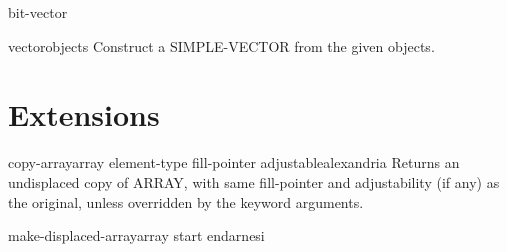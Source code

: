 \begin{class}{bit-vector}{}{}{}
  
\end{class}

\begin{class}{vector}{\rest objects}{}{}
  Construct a SIMPLE-VECTOR from the given objects.
\end{class}

\section{Extensions}
\label{sec:extensions}

\begin{function}{copy-array}{array \key element-type fill-pointer adjustable}{alexandria}{}
  Returns an undisplaced copy of ARRAY, with same fill-pointer
and adjustability (if any) as the original, unless overridden by
the keyword arguments.
\end{function}

\begin{function}{make-displaced-array}{array \op start end}{arnesi}{}
  
\end{function}

